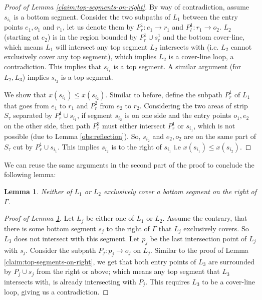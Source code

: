 \documentclass[10pt,a4paper]{amsart}
\theoremstyle{thmstyleone}
\newtheorem{lemma}{Lemma}
\begin{document}
\begin{proof}[Proof of Lemma \ref{claim:top-segments-on-right}]
	By way of contradiction, assume $s_{i_1}$ is a bottom segment. 
	Consider the two subpaths of $L_1$ between the entry points $e_1,o_1$ and $r_1$, let us denote them by $P^1_r: e_1 \to r_1$ and $P^1_l:r_1 \to o_2$. 
	$L_2$ (starting at $e_2$) is in the region bounded by $P^1_r\cup s^1_r$ and the bottom cover-line, which means $L_1$ will intersect any top segment
	$L_2$ intersects with (i.e. $L_2$ cannot exclusively cover any top segment), which implies $L_2$ is a cover-line loop, a contradiction.
	This implies that $s_{i_1}$ is a top segment.
	A similar argument (for $L_2,L_3$) implies $s_{i_2}$ is a top segment.
	
	We show that $x(s_{i_1}) \le x(s_{i_2})$. Similar to before, define the subpath $P^1_r$ of $L_1$ that goes from $e_1$ to $r_1$ and $P^2_r$ from $e_2$ to $r_2$. Considering the two areas of strip $S_\tau$ separated by $P^1_r \cup s_{i_1}$, if segment $s_{i_2}$ is on one side and the entry points $o_1, e_2$ on the other side, then path  $P^2_r$ must either intersect $P^1_r$ or $s_{i_1}$, which is not possible (due to Lemma \ref{obs:reflection}). So, $s_{i_2}$ and $e_2,o_2$ are on the same part of $S_\tau$ cut by $P^1_r\cup s_{i_1}$. This implies $s_{i_2}$ is to the right of $s_{i_1}$ i.e $x(s_{i_1}) \le x(s_{i_2})$. 
\end{proof}
    
    We can reuse the same arguments in the second part of the proof to conclude the following lemma:
    \begin{lemma}\label{claim:no-bottom-cover}
        Neither of $L_1$ or $L_2$ exclusively cover a bottom segment on the right of $\Gamma$.
    \end{lemma}
    
    \begin{proof}[Proof of Lemma \ref{claim:no-bottom-cover}]
        Let $L_j$ be either one of $L_1$ or $L_2$. Assume the contrary, that there is some bottom segment $s_j$ to the right of $\Gamma$ that $L_j$ exclusively covers. So $L_3$ does not intersect with this segment. Let $p_j$ be the last intersection point of $L_j$ with $s_j$. Consider the subpath $P_j: p_j \to o_j$ on $L_j$. Similar to the proof of Lemma \ref{claim:top-segments-on-right}, we get that both entry points of $L_3$ are surrounded by $P_j \cup s_j$ from the right or above; which means any top segment that $L_3$ intersects with, is already intersecting with $P_j$. This requires $L_3$ to be a cover-line loop, giving us a contradiction. 
    \end{proof}
    
\end{document}

